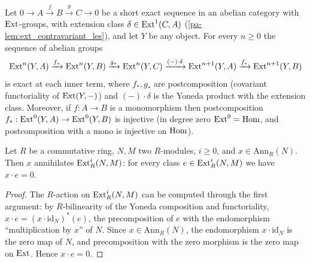 \begin{lemma}
  \label{pa-lem:ext_covariant_les}
  \mathlibok

  Let \(0 \to A \xrightarrow{f} B \xrightarrow{g} C \to 0\) be a short exact sequence in
  an abelian category with \(\operatorname{Ext}\)-groups, with extension class
  \(\delta \in \operatorname{Ext}^1(C, A)\) (\ref{pa-lem:ext_contravariant_les}), and let \(Y\) be any
  object. For every \(n \geq 0\) the sequence of abelian groups
  \[
    \operatorname{Ext}^n(Y, A) \xrightarrow{f_*} \operatorname{Ext}^n(Y, B) \xrightarrow{g_*} \operatorname{Ext}^n(Y, C)
      \xrightarrow{(-) \cdot \delta} \operatorname{Ext}^{n+1}(Y, A) \xrightarrow{f_*} \operatorname{Ext}^{n+1}(Y, B)
  \]
  is exact at each inner term, where \(f_*, g_*\) are postcomposition (covariant
  functoriality of \(\operatorname{Ext}(Y, -)\)) and \((-) \cdot \delta\) is the Yoneda product with
  the extension class. Moreover, if \(f : A \to B\) is a monomorphism then
  postcomposition \(f_* : \operatorname{Ext}^0(Y, A) \to \operatorname{Ext}^0(Y, B)\) is injective (in degree zero
  \(\operatorname{Ext}^0 = \operatorname{Hom}\), and postcomposition with a mono is injective on \(\operatorname{Hom}\)).
\end{lemma}

\begin{lemma}
  \label{pa-lem:ext_annihilator_smul}
  \leanok

  Let \(R\) be a commutative ring, \(N, M\) two \(R\)-modules, \(i \geq 0\), and
  \(x \in \mathrm{Ann}_R(N)\). Then \(x\) annihilates \(\operatorname{Ext}^i_R(N, M)\): for every
  class \(e \in \operatorname{Ext}^i_R(N, M)\) we have \(x \cdot e = 0\).
\end{lemma}
\begin{proof}
  \leanok
  The \(R\)-action on \(\operatorname{Ext}^i_R(N, M)\) can be computed through the first argument: by
  \(R\)-bilinearity of the Yoneda composition and functoriality,
  \(x \cdot e = (x \cdot \mathrm{id}_N)^*(e)\), the precomposition of \(e\) with the
  endomorphism ``multiplication by \(x\)'' of \(N\). Since \(x \in \mathrm{Ann}_R(N)\),
  the endomorphism \(x \cdot \mathrm{id}_N\) is the zero map of \(N\), and
  precomposition with the zero morphism is the zero map on \(\operatorname{Ext}\). Hence
  \(x \cdot e = 0\).
\end{proof}

